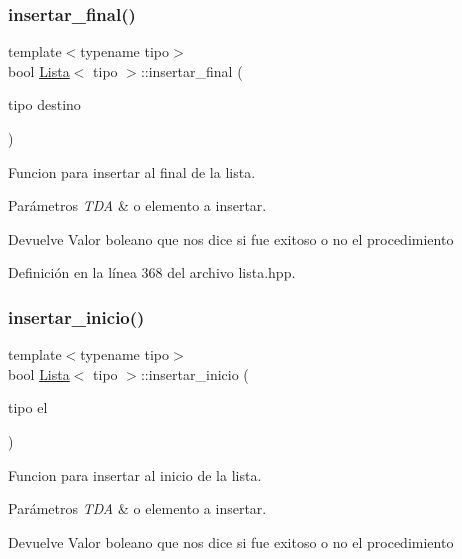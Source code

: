 \mbox{\label{classLista_a4ff75a84824729ce5af9d9f5d184020a}} 
\subsubsection{\texorpdfstring{insertar\+\_\+final()}{insertar\_final()}}
{\footnotesize\ttfamily template$<$typename tipo$>$ \\
bool \hyperlink{classLista}{Lista}$<$ tipo $>$\+::insertar\+\_\+final (\begin{DoxyParamCaption}\item[{tipo}]{destino }\end{DoxyParamCaption})}



Funcion para insertar al final de la lista. 


\begin{DoxyParams}{Parámetros}
{\em T\+DA} & o elemento a insertar. \\
\hline
\end{DoxyParams}
\begin{DoxyReturn}{Devuelve}
Valor boleano que nos dice si fue exitoso o no el procedimiento 
\end{DoxyReturn}


Definición en la línea 368 del archivo lista.\+hpp.

\mbox{\label{classLista_a4b6c7156fcd7ca69d5b12bcbb3312590}} 
\subsubsection{\texorpdfstring{insertar\+\_\+inicio()}{insertar\_inicio()}}
{\footnotesize\ttfamily template$<$typename tipo$>$ \\
bool \hyperlink{classLista}{Lista}$<$ tipo $>$\+::insertar\+\_\+inicio (\begin{DoxyParamCaption}\item[{tipo}]{el }\end{DoxyParamCaption})}



Funcion para insertar al inicio de la lista. 


\begin{DoxyParams}{Parámetros}
{\em T\+DA} & o elemento a insertar. \\
\hline
\end{DoxyParams}
\begin{DoxyReturn}{Devuelve}
Valor boleano que nos dice si fue exitoso o no el procedimiento 
\end{DoxyReturn}


